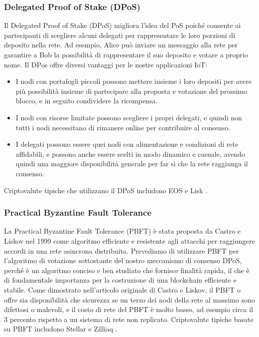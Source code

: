 \subsubsection{Delegated Proof of Stake (DPoS)}
Il Delegated Proof of Stake (DPoS) migliora l'idea del PoS poiché consente ai partecipanti di scegliere alcuni delegati per rappresentare le loro porzioni di deposito nella rete. Ad esempio, Alice può inviare un messaggio alla rete per garantire a Bob la possibilità di rappresentare il suo deposito e votare a proprio nome. Il DPos offre diversi vantaggi per le nostre applicazioni IoT:

\begin{itemize}
	\item I nodi con portafogli piccoli possono mettere insieme i loro depositi per avere più possibilità insieme di partecipare alla proposta e votazione del prossimo blocco, e in seguito condividere la ricompensa.

	\item I nodi con risorse limitate possono scegliere i propri delegati, e quindi non tutti i nodi necessitano di rimanere online per contribuire al consenso.

	\item I delegati possono essere quei nodi con alimentazione e condizioni di rete affidabili, e possono anche essere scelti in modo dinamico e casuale, avendo quindi una maggiore disponibilità generale per far sì che la rete raggiunga il consenso.
\end{itemize}

Criptovalute tipiche che utilizzano il DPoS includono EOS \cite{c9} e Lisk \cite{c18}.

\subsubsection{Practical Byzantine Fault Tolerance}
La Practical Byzantine Fault Tolerance (PBFT) è stata proposta da Castro e Liskov \cite{c7} nel 1999 come algoritmo efficiente e resistente agli attacchi per raggiungere accordi in una rete asincrona distribuita. Prevediamo di utilizzare PBFT per l'algoritmo di votazione sottostante del nostro meccanismo di consenso DPoS, perché è un algoritmo conciso e ben studiato che fornisce finalità rapida, il che è di fondamentale importanza per la costruzione di una
blockchain efficiente e stabile. Come dimostrato nell'articolo originale di Castro e Liskov, il PBFT o offre sia disponibilità che sicurezza se un terzo dei nodi della rete al massimo sono difettosi o malevoli, e il costo di rete del PBFT è molto basso, ad esempio circa il 3 percento rispetto a un sistema di rete non replicato. Criptovalute tipiche basate su PBFT includono Stellar \cite{c30} e Zilliaq \cite{c38}.

